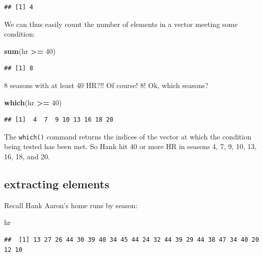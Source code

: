 \documentclass[
]{book}
\newenvironment{Shaded}{\begin{snugshade}}{\end{snugshade}}
\newcommand{\DecValTok}[1]{\textcolor[rgb]{0.00,0.00,0.81}{#1}}
\newcommand{\FunctionTok}[1]{\textcolor[rgb]{0.13,0.29,0.53}{\textbf{#1}}}
\newcommand{\NormalTok}[1]{#1}
\newcommand{\SpecialCharTok}[1]{\textcolor[rgb]{0.81,0.36,0.00}{\textbf{#1}}}
\theoremstyle{definition}
\theoremstyle{definition}
\theoremstyle{definition}
\theoremstyle{definition}
\theoremstyle{remark}
\begin{document}
\begin{verbatim}
## [1] 4
\end{verbatim}

We can thus easily count the number of elements in a vector meeting some condition:

\begin{Shaded}
\begin{Highlighting}[]
\FunctionTok{sum}\NormalTok{(hr }\SpecialCharTok{\textgreater{}=} \DecValTok{40}\NormalTok{)}
\end{Highlighting}
\end{Shaded}

\begin{verbatim}
## [1] 8
\end{verbatim}

8 seasons with at least 40 HR?!! Of course! 8! Ok, which seasons?

\begin{Shaded}
\begin{Highlighting}[]
\FunctionTok{which}\NormalTok{(hr }\SpecialCharTok{\textgreater{}=} \DecValTok{40}\NormalTok{)}
\end{Highlighting}
\end{Shaded}

\begin{verbatim}
## [1]  4  7  9 10 13 16 18 20
\end{verbatim}

The \texttt{which()} command returns the indices of the vector at which the condition being tested has been met. So Hank hit 40 or more HR in seasons 4, 7, 9, 10, 13, 16, 18, and 20.

\subsection*{extracting elements}\label{extracting-elements}

Recall Hank Aaron's home runs by season:

\begin{Shaded}
\begin{Highlighting}[]
\NormalTok{hr}
\end{Highlighting}
\end{Shaded}

\begin{verbatim}
##  [1] 13 27 26 44 30 39 40 34 45 44 24 32 44 39 29 44 38 47 34 40 20 12 10
\end{verbatim}
\end{document}

